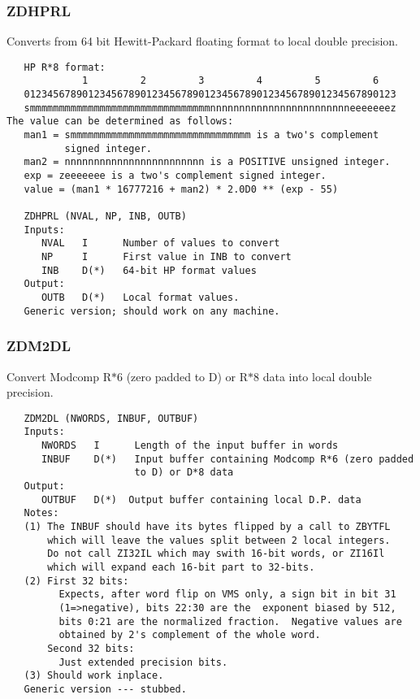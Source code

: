 \subsubsection{ZDHPRL}
Converts from 64 bit Hewitt-Packard floating format to local double
precision.
\begin{verbatim}
   HP R*8 format:
             1         2         3         4         5         6
   0123456789012345678901234567890123456789012345678901234567890123
   smmmmmmmmmmmmmmmmmmmmmmmmmmmmmmmnnnnnnnnnnnnnnnnnnnnnnnneeeeeeez
The value can be determined as follows:
   man1 = smmmmmmmmmmmmmmmmmmmmmmmmmmmmmmm is a two's complement
          signed integer.
   man2 = nnnnnnnnnnnnnnnnnnnnnnnn is a POSITIVE unsigned integer.
   exp = zeeeeeee is a two's complement signed integer.
   value = (man1 * 16777216 + man2) * 2.0D0 ** (exp - 55)

   ZDHPRL (NVAL, NP, INB, OUTB)
   Inputs:
      NVAL   I      Number of values to convert
      NP     I      First value in INB to convert
      INB    D(*)   64-bit HP format values
   Output:
      OUTB   D(*)   Local format values.
   Generic version; should work on any machine.
\end{verbatim}

\subsubsection{ZDM2DL}
Convert Modcomp R$\ast6$ (zero padded to D) or R$\ast8$ data into
local double precision.
\begin{verbatim}
   ZDM2DL (NWORDS, INBUF, OUTBUF)
   Inputs:
      NWORDS   I      Length of the input buffer in words
      INBUF    D(*)   Input buffer containing Modcomp R*6 (zero padded
                      to D) or D*8 data
   Output:
      OUTBUF   D(*)  Output buffer containing local D.P. data
   Notes:
   (1) The INBUF should have its bytes flipped by a call to ZBYTFL
       which will leave the values split between 2 local integers.
       Do not call ZI32IL which may swith 16-bit words, or ZI16Il
       which will expand each 16-bit part to 32-bits.
   (2) First 32 bits:
         Expects, after word flip on VMS only, a sign bit in bit 31
         (1=>negative), bits 22:30 are the  exponent biased by 512,
         bits 0:21 are the normalized fraction.  Negative values are
         obtained by 2's complement of the whole word.
       Second 32 bits:
         Just extended precision bits.
   (3) Should work inplace.
   Generic version --- stubbed.
\end{verbatim}

